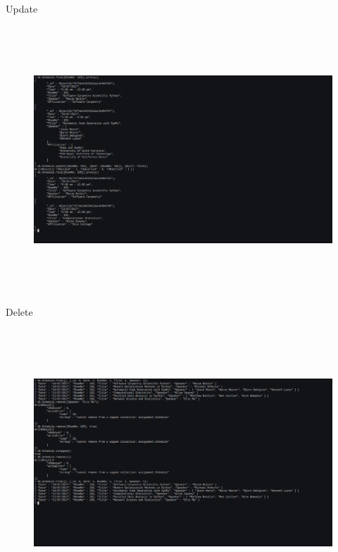 \documentclass[a4paper,11pt,openright]{report}
\begin{document}
\pagebreak

{\footnotesize Update}
\begin{figure}[ht!]
\includegraphics[width=20cm,height=10cm,keepaspectratio]{image3.pdf}
\centering
\end{figure}

\vspace{20px}

{\footnotesize Delete}
\begin{figure}[ht!]
\includegraphics[width=20cm,height=10cm,keepaspectratio]{image4.pdf}
\centering
\end{figure}
\end{document}
